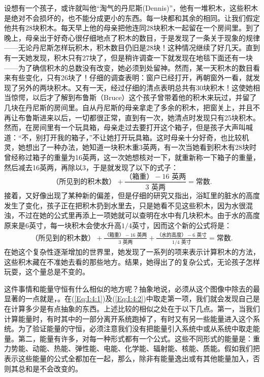 设想有一个孩子，或许就叫他“淘气的丹尼斯(Dennis)”，他有一堆积木，这些积木是绝对不会损坏的，也不能分成更小的东西。每一块都和其余的相同。让我们假定他共有28块积木。每天早上他的母亲把他连同28块积木一起留在一个房间里。到了晚上，母亲出于好奇心很仔细地点了积木的数目，于是发现了一条关于现象的规律——无论丹尼斯怎样玩积木，积木数目仍旧是28块！这种情况继续了好几天。直到有一天她发现，积木只有27块了，但是稍许调查一下就发现在地毯下面还有一块——为了确信积木的总数没有改变，她必须到处留神。然而，某一天积木的数目看来有些变化，只有26块了！仔细的调查表明：窗户已经打开，再朝窗外一看，就发现了另外的两块积木。又有一天，经过仔细的清点表明总共有30块积木！这使她相当惊愕，以后才了解到布鲁斯（Bruce）这个孩子曾带着他的积木来玩过，并留了几块在丹尼斯的房间里。自从丹尼斯的母亲拿走了多余的积木，把窗关上，并且不再让布鲁斯进来以后，一切都很正常，直到有一次，她清点时发现只有25块积木。然而，在房间里有一个玩具箱，母亲走过去要打开这个箱子，但是孩子大声叫喊道：“不，别打开我的箱子，”不让她打开玩具箱。这时母亲十分好奇，也比较机灵，她想出了一种办法，她知道一块积木重3英两，有一次当她看到积木有28块时曾经称过箱子的重量为16英两，这一次她想核对一下，就重新称一下箱子的重量，然后减去16英两，再除以3，于是就发现了以下的式子：
\begin{equation}
    \label{Eq:I:4:1}
    \text{（所见到的积木数）}
    +
    \frac{\text{（箱重）}-\text{$16$ 英两}}{\text{$3$ 英两}}=
    \text{常数}.
\end{equation}
接着，又好像出现了某种新的偏差，但是仔细的研究又指出，浴缸里的脏水的高度发生了变化，孩子正在把积木扔到水里去，只是她看不见这些积木，因为水很混浊，不过在她的公式里再添上一项她就可以查明在水中有几块积木。由于水的高度原来是6英寸，每一块积木会使水升高$1/4$英寸，因而这个新的公式将是：
\begin{align}
    \label{Eq:I:4:2}
    \text{（所见到的积木数）}
    +
    \frac{\text{（箱重）}-\text{$16$ 英两}}{\text{$3$ 英两}} +
    \frac{\text{（水的高度）}-\text{$6$ 英寸}}{\text{$1/4$ 英寸}}
    =
    \text{常数}.
\end{align}
在她这个复杂性逐渐增加的世界里，她发现了一系列的项来表示计算积木的方法，这些积木藏在不准她去看的那些地方。结果，她得出了的复杂公式，无论孩子怎样玩耍，这个量总是不变的。

这件事情和能量守恒有什么相似的地方呢？抽象地说，必须从这个图像中除去的最显著的一点就是，。在(\ref{Eq:I:4:1})及(\ref{Eq:I:4:2})中取走第一项，我们就会发现自己是在计算多少是有点抽象的东西。上述比较的相似之处在于以下几点。第一，当我们计算能量时，有时其中的一部分离开系统跑掉了，有时又有另一些能量进入这个系统。为了验证能量的守恒，必须注意我们没有把能量引入系统中或从系统中取走能量。第二，能量有许多，对每一种形式都有一个公式。这些不同形式的能量是：重力势能、动能、热能、弹性能、电能、化学能、辐射能、核能、质能。假如我们把表示这些能量的公式全都加在一起，那么，除非有能量逸出或有其他能量加入，否则其总和是不会改变的。


